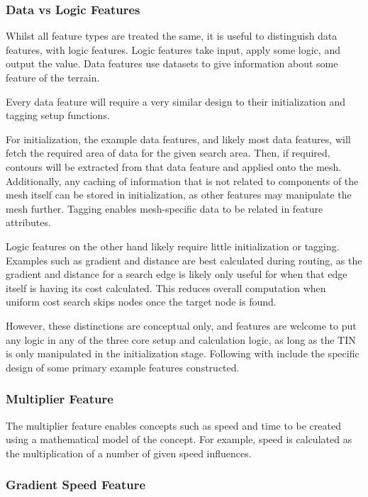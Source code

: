 \documentclass[12pt]{article}
\begin{document}
\subsubsection{Data vs Logic Features}

Whilst all feature types are treated the same, it is useful to distinguish data features, with logic features. Logic features take input, apply some logic, and output the value. Data features use datasets to give information about some feature of the terrain.

Every data feature will require a very similar design to their initialization and tagging setup functions.

For initialization, the example data features, and likely most data features, will fetch the required area of data for the given search area. Then, if required, contours will be extracted from that data feature and applied onto the mesh. Additionally, any caching of information that is not related to components of the mesh itself can be stored in initialization, as other features may manipulate the mesh further. Tagging enables mesh-specific data to be related in feature attributes.

Logic features on the other hand likely require little initialization or tagging. Examples such as gradient and distance are best calculated during routing, as the gradient and distance for a search edge is likely only useful for when that edge itself is having its cost calculated. This reduces overall computation when uniform cost search skips nodes once the target node is found.

However, these distinctions are conceptual only, and features are welcome to put any logic in any of the three core setup and calculation logic, as long as the TIN is only manipulated in the initialization stage. Following with include the specific design of some primary example features constructed.

\subsubsection{Multiplier Feature}

The multiplier feature enables concepts such as speed and time to be created using a mathematical model of the concept. For example, speed is calculated as the multiplication of a number of given speed influences.

\subsubsection{Gradient Speed Feature}
\end{document}
